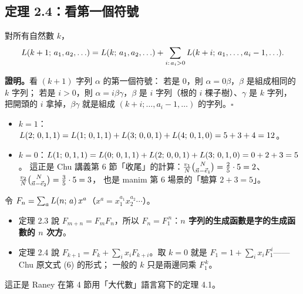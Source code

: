 \subsection{定理 2.4：看第一個符號}

\begin{thmbox}[定理 2.4 \paper{p.~444}]
對所有自然數 $k$，
\[
L(k+1;\,a_1,a_2,\ldots)=L(k;\,a_1,a_2,\ldots)+\sum_{i:\,a_i>0}L(k+i;\,a_1,\ldots,a_i-1,\ldots).
\]
\end{thmbox}

\textbf{證明。}看 $(k+1)$ 字列 $\alpha$ 的第一個符號：
若是 0，則 $\alpha=0\beta$，$\beta$ 是組成相同的 $k$ 字列；
若是 $i>0$，則 $\alpha=i\beta\gamma$，$\beta$ 是 $i$ 字列（根的 $i$ 棵子樹）、$\gamma$ 是 $k$ 字列，
把開頭的 $i$ 拿掉，$\beta\gamma$ 就是組成 $(k+i;\ldots,a_i-1,\ldots)$ 的字列。\hfill$\square$

\begin{exbox}[例]
\begin{itemize}[leftmargin=1.2em]
  \item $k=1$：$L(2;\,0,1,1)=L(1;\,0,1,1)+L(3;\,0,0,1)+L(4;\,0,1,0)=5+3+4=12$。
  \item $k=0$：$L(1;\,0,1,1)=L(0;\,0,1,1)+L(2;\,0,0,1)+L(3;\,0,1,0)=0+2+3=5$。
        這正是 Chu 講義第 6 節「收尾」的計算：$\frac{v_1}{N}\binom{N}{\vec n-\vec e_1}=\frac25\cdot5=2$、$\frac{v_2}{N}\binom{N}{\vec n-\vec e_2}=\frac35\cdot5=3$，
        也是 manim 第 6 場景的「驗算 $2+3=5$」。
\end{itemize}
\end{exbox}

\begin{keybox}
令 $F_n=\sum_aL(n;\,a)\,x^a$（$x^a=x_1^{a_1}x_2^{a_2}\cdots$）。
\begin{itemize}[leftmargin=1.4em]
  \item 定理 2.3 說 $F_{m+n}=F_mF_n$，所以 $F_n=F_1^{\,n}$：\textbf{$n$ 字列的生成函數是字的生成函數的 $n$ 次方}。
  \item 定理 2.4 說 $F_{k+1}=F_k+\sum_ix_iF_{k+i}$。取 $k=0$ 就是 $F_1=1+\sum_ix_iF_1^{\,i}$——Chu 原文式 (6) 的形式；
        一般的 $k$ 只是兩邊同乘 $F_1^{\,k}$。
\end{itemize}
這正是 Raney 在第 4 節用「大代數」語言寫下的定理 4.1。
\end{keybox}
